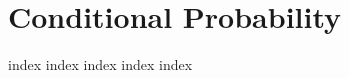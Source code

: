 \chapter{Conditional Probability}
\label{ch:cp}
\ifdefined\HCode
\else
{
\startcontents[chapter]
}
\fi

{index}
{index}
{index}
{index}
{index}

\ifdefined\HCode
{}
\fi

\ifdefined\HCode
\else
{
\stopcontents[chapter]
}
\fi

\ifdefined\HCode
{}
\fi